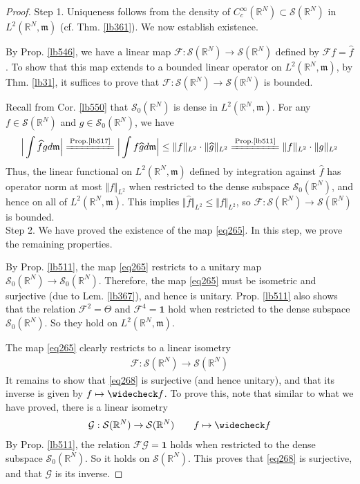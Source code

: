 \documentclass[12pt,b5paper,notitlepage]{article}
\theoremstyle{definition}
\theoremstyle{plain}
\newcommand{\wht}{\widehat}
\newcommand{\wch}{\widecheck}
\newcommand{\idt}{\mathbf{1}}
\newcommand{\Rbb}{\mathbb R}
\newcommand{\mk}{\mathfrak m}
\newcommand{\MG}{\mathcal G}
\newcommand{\MF}{\mathcal F}
\newcommand{\MS}{\mathcal S}
\numberwithin{equation}{section}
\begin{document}
\begin{proof}
Step 1. Uniqueness follows from the density of $C_c^\infty(\Rbb^N) \subset \MS(\Rbb^N)$ in $L^2(\Rbb^N,\mk)$ (cf. Thm. \ref{lb361}). We now establish existence.

By Prop. \ref{lb546}, we have a linear map $\MF:\MS(\Rbb^N)\rightarrow\MS(\Rbb^N)$ defined by $\MF f=\wht f$. To show that this map extends to a bounded linear operator on $L^2(\Rbb^N,\mk)$, by Thm. \ref{lb31}, it suffices to prove that $\MF:\MS(\Rbb^N)\rightarrow\MS(\Rbb^N)$ is bounded.

Recall from Cor. \ref{lb550} that $\MS_0(\Rbb^N)$ is dense in $L^2(\Rbb^N,\mk)$. For any $f\in\MS(\Rbb^N)$ and $g\in\MS_0(\Rbb^N)$, we have
\begin{align*}
\Big|\int\wht f g d\mk\Big|\xlongequal{\text{Prop.\ref{lb517}}}\Big|\int f\wht g d\mk\Big|\leq\Vert f\Vert_{L^2}\cdot \Vert \wht g\Vert_{L^2}\xlongequal{\text{Prop.\ref{lb511}}}\Vert f\Vert_{L^2}\cdot \Vert g\Vert_{L^2}
\end{align*}
Thus, the linear functional on $L^2(\Rbb^N,\mk)$ defined by integration against $\wht f$ has operator norm at most $\Vert f\Vert_{L^2}$ when restricted to the dense subspace $\MS_0(\Rbb^N)$, and hence on all of $L^2(\Rbb^N,\mk)$. This implies $\Vert\wht f\Vert_{L^2}\leq\Vert f\Vert_{L^2}$, so $\MF:\MS(\Rbb^N)\rightarrow\MS(\Rbb^N)$ is bounded. \\[-1ex]

Step 2. We have proved the existence of the map \eqref{eq265}. In this step, we prove the remaining properties.

By Prop. \ref{lb511}, the map \eqref{eq265} restricts to a unitary map $\MS_0(\Rbb^N)\rightarrow\MS_0(\Rbb^N)$. Therefore, the map \eqref{eq265} must be isometric and surjective (due to Lem. \ref{lb367}), and hence is unitary. Prop. \ref{lb511} also shows that the relation $\MF^2=\Theta$ and $\MF^4=\idt$ hold when restricted to the dense subspace $\MS_0(\Rbb^N)$. So they hold on $L^2(\Rbb^N,\mk)$.

The map \eqref{eq265} clearly restricts to a linear isometry
\begin{align}\label{eq268}
\MF:\MS(\Rbb^N)\rightarrow\MS(\Rbb^N)
\end{align}
It remains to show that \eqref{eq268} is surjective (and hence unitary), and that its inverse is given by $f\mapsto\wch f$. To prove this, note that similar to what we have proved, there is a linear isometry
\begin{gather*}
\MG:\MS(\Rbb^N)\rightarrow\MS(\Rbb^N)\qquad f\mapsto\wch f
\end{gather*}
By Prop. \ref{lb511}, the relation $\MF\MG=\idt$ holds when restricted to the dense subspace $\MS_0(\Rbb^N)$. So it holds on $\MS(\Rbb^N)$. This proves that \eqref{eq268} is surjective, and that $\MG$ is its inverse.
\end{proof}
\end{document}
